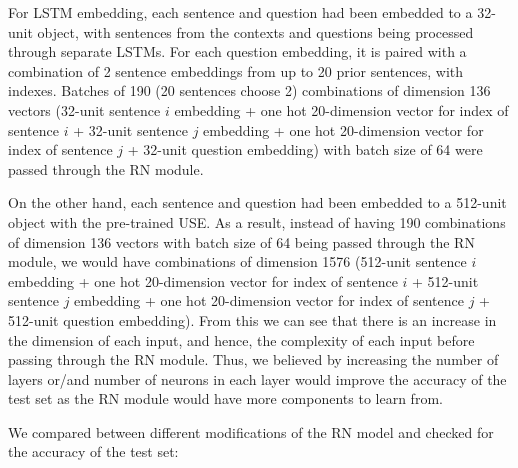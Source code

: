 \documentclass{article}
\begin{document}
 

For LSTM embedding, each sentence and question had been embedded to a 32-unit object, with sentences from the contexts and questions being processed through separate LSTMs. For each question embedding, it is paired with a combination of 2 sentence embeddings from up to 20 prior sentences, with indexes. Batches of 190 (20 sentences choose 2) combinations of dimension 136 vectors (32-unit sentence $i$ embedding + one hot 20-dimension vector for index of sentence $i$ + 32-unit sentence $j$ embedding + one hot 20-dimension vector for index of sentence $j$ + 32-unit question embedding) with batch size of 64 were passed through the RN module.

 

On the other hand, each sentence and question had been embedded to a 512-unit object with the pre-trained USE. As a result, instead of having 190 combinations of dimension 136 vectors with batch size of 64 being passed through the RN module, we would have combinations of dimension 1576 (512-unit sentence $i$ embedding + one hot 20-dimension vector for index of sentence $i$ + 512-unit sentence $j$ embedding + one hot 20-dimension vector for index of sentence $j$ + 512-unit question embedding). From this we can see that there is an increase in the dimension of each input, and hence, the complexity of each input before passing through the RN module. Thus, we believed by increasing the number of layers or/and number of neurons in each layer would improve the accuracy of the test set as the RN module would have more components to learn from.

 

We compared between different modifications of the RN model and checked for the accuracy of the test set:

 
\end{document}
